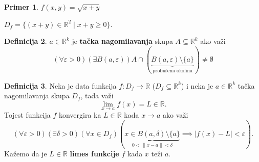 \documentclass[11pt]{article}
\theoremstyle{definition}
\newtheorem{definicija}{Definicija}[section]
\newtheorem{primer}[definicija]{Primer}
\theoremstyle{serbnodot}
\begin{document}
\begin{primer}
    \(f(x, y) = \sqrt{x + y}\)

    \(D_f = \{ (x + y) \in \mathbb{R}^2 \mid x + y \geq 0\}\).

    \begin{center}
    \end{center}

\end{primer}

\begin{definicija}
    \(a \in \mathbb{R}^k\) je \textbf{tačka nagomilavanja} skupa 
    \(A \subseteq \mathbb{R}^k\) ako važi
    \[
        (\forall \varepsilon > 0) (\exists B(a, \varepsilon)) 
        A \cap (\underbrace{B(a, \varepsilon) \setminus 
        \{a\}}_{\text{probušena okolina}}) \neq \emptyset
    \]
\end{definicija}

\begin{definicija}
    Neka je data funkcija \(f: D_f \to \mathbb{R}\) (\(D_f \subseteq \mathbb{R}^k\)) i
    neka je \(a \in \mathbb{R}^k\) tačka nagomilavanja skupa \(D_f\), tada važi
    \[
        \lim_{x \to a} f(x) = L \in \mathbb{R}.
    \]
    Tojest funkcija \(f\) konvergira ka \(L \in \mathbb{R}\) kada \(x \to a\)
    ako važi
    \[
        (\forall \varepsilon > 0) (\exists \delta > 0) (\forall x \in D_f)
        (\underbrace{x \in B(a, \delta) \setminus \{a\}}_
        {0 < \lVert x - a \rVert < \delta} \implies \lvert f(x) - L \rvert < \varepsilon).
    \]
    Kažemo da je \(L \in \mathbb{R}\) \textbf{limes funkcije} \(f\) kada \(x\) teži \(a\).
\end{definicija}
\end{document}
